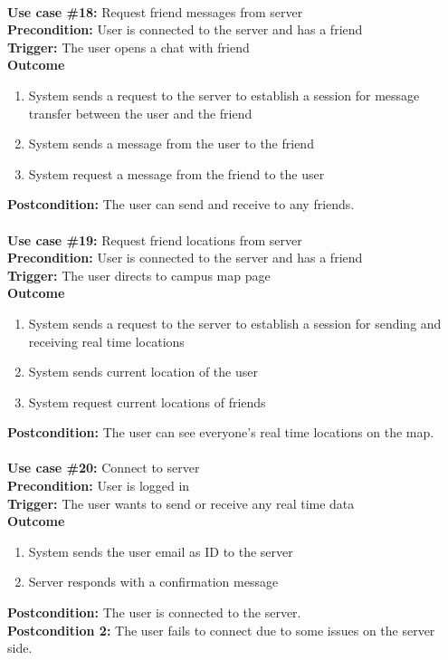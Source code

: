 \documentclass[12pt]{article}
\begin{document}
\noindent\\
\textbf{Use case \#18:} Request friend messages from server\\
\textbf{Precondition:} User is connected to the server and has a friend\\
\textbf{Trigger:} The user opens a chat with friend\\
\textbf{Outcome}
\begin{enumerate}
	\item System sends a request to the server to establish a session for message transfer between the user and the friend
    \item System sends a message from the user to the friend
    \item System request a message from the friend to the user
\end{enumerate}
\textbf{Postcondition:} The user can send and receive to any friends.\\


\noindent\\
\textbf{Use case \#19:} Request friend locations from server\\
\textbf{Precondition:} User is connected to the server and has a friend\\
\textbf{Trigger:} The user directs to campus map page\\
\textbf{Outcome}
\begin{enumerate}
	\item System sends a request to the server to establish a session for sending and receiving real time locations
    \item System sends current location of the user
    \item System request current locations of friends
\end{enumerate}
\textbf{Postcondition:} The user can see everyone's real time locations on the map.\\


\noindent\\
\textbf{Use case \#20:} Connect to server\\
\textbf{Precondition:} User is logged in\\
\textbf{Trigger:} The user wants to send or receive any real time data\\
\textbf{Outcome}
\begin{enumerate}
	\item System sends the user email as ID to the server
    \item Server responds with a confirmation message
\end{enumerate}
\textbf{Postcondition:} The user is connected to the server.\\
\textbf{Postcondition 2:} The user fails to connect due to some issues on the server side.\\
\end{document}
